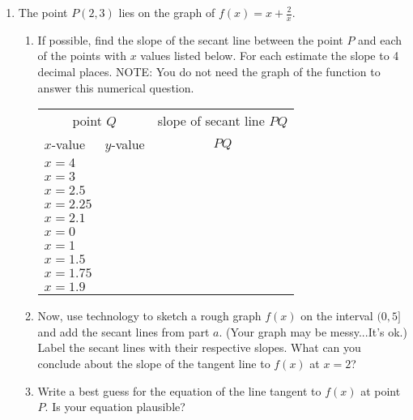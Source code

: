 \documentclass[11pt,fleqn]{article}
\begin{document}
\renewcommand{\headrulewidth}{0pt}
\newcommand{\blank}[1]{\rule{#1}{0.75pt}}
\renewcommand{\d}{\displaystyle}
\vspace*{-0.7in}
\begin{center}
  \large {}
\end{center}



\begin{enumerate}
\item The point $P(2,3)$ lies on the graph of $f(x)=x+\frac{2}{x}.$
	\begin{enumerate}
	\item If possible, find the slope of the secant line between the point $P$ and each of the points with $x$ values listed below. For each estimate the slope to 4 decimal places. NOTE: You do not need the graph of the function to answer this numerical question.\\
		{\LARGE{\begin{center}
		\begin{tabular}{l | l | c}
		\multicolumn{2}{c}{point $Q$}& slope of secant line $PQ$\\
		$x$-value&\quad$y$-value \quad \quad& $PQ$\\
		\hline
		$x=4$&&\\
		\hline
		$x=3$&&\\
		\hline
		$x=2.5$&&\\
		\hline
		$x=2.25$&&\\
		\hline
		$x=2.1$&&\\
		\hline
		$x=0$&&\\
		\hline
		$x=1$&&\\
		\hline
		$x=1.5$&&\\
		\hline
		$x=1.75$&&\\
		\hline
		$x=1.9$&&\\
		\hline
		\end{tabular}
		\end{center}}}
	\item  Now, use technology to sketch a rough graph $f(x)$ on the interval $(0,5]$ and add the secant lines from part $a$. (Your graph may be messy...It's ok.) Label the secant lines with their respective slopes. What can you conclude about the slope of the tangent line to $f(x)$ at $x=2$?
	\vfill
	\item Write a best guess for the equation of the line tangent to $f(x)$ at point $P$. Is your equation plausible?
	\vspace{.5in}
	\end{enumerate}
	\newpage


\end{enumerate}
\end{document}
